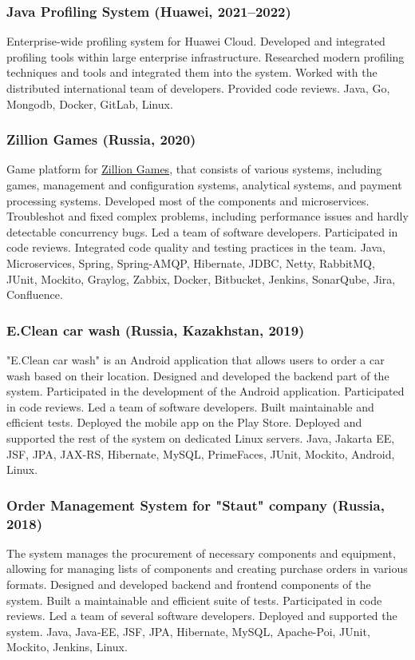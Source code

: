 \documentclass{vl}
\begin{document}
    \subsubsection*{Java Profiling System (Huawei, 2021--2022)}
    Enterprise-wide profiling system for Huawei Cloud.
    Developed and integrated profiling tools within large enterprise infrastructure.
    Researched modern profiling techniques and tools and integrated them into the system.
    Worked with the distributed international team of developers.
    Provided code reviews.
    Java, Go, Mongodb, Docker, GitLab, Linux.

    \subsubsection*{Zillion Games (Russia, 2020)}
    Game platform for \href{http://zillion.games/}{Zillion Games}, that consists of various systems, including games,
    management and configuration systems, analytical systems, and payment processing systems.
    Developed most of the components and microservices.
    Troubleshot and fixed complex problems, including performance issues and hardly detectable concurrency bugs.
    Led a team of software developers.
    Participated in code reviews.
    Integrated code quality and testing practices in the team.
    Java, Microservices, Spring, Spring-AMQP, Hibernate, JDBC, Netty, RabbitMQ, JUnit, Mockito, Graylog, Zabbix, Docker,
    Bitbucket, Jenkins, SonarQube, Jira, Confluence.

    \subsubsection*{E.Clean car wash (Russia, Kazakhstan, 2019)}
    "E.Clean car wash" is an Android application
    that allows users to order a car wash based on their location.
    Designed and developed the backend part of the system.
    Participated in the development of the Android application.
    Participated in code reviews.
    Led a team of software developers.
    Built maintainable and efficient tests.
    Deployed the mobile app on the Play Store.
    Deployed and supported the rest of the system on dedicated Linux servers.
    Java, Jakarta EE, JSF, JPA, JAX-RS, Hibernate, MySQL, PrimeFaces, JUnit, Mockito, Android, Linux.

    \subsubsection*{Order Management System for "Staut" company (Russia, 2018)}
    The system manages the procurement of necessary components and equipment,
    allowing for managing lists of components and creating purchase orders in various formats.
    Designed and developed backend and frontend components of the system.
    Built a maintainable and efficient suite of tests.
    Participated in code reviews.
    Led a team of several software developers.
    Deployed and supported the system.
    Java, Java‐EE, JSF, JPA, Hibernate, MySQL, Apache-Poi, JUnit, Mockito, Jenkins, Linux.
\end{document}
